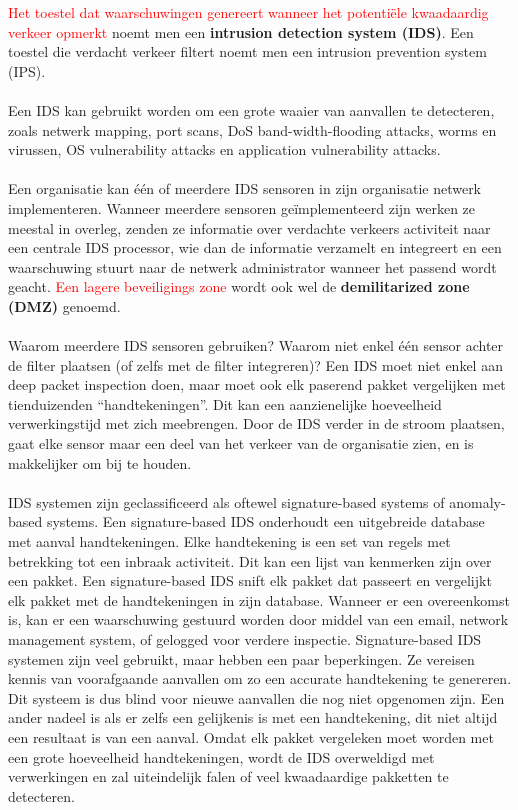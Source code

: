 \noindent\textcolor{red}{ Het toestel dat waarschuwingen genereert wanneer het potentiële kwaadaardig verkeer opmerkt} noemt men een \textbf{intrusion detection system (IDS)}. Een toestel die verdacht verkeer filtert noemt men een intrusion prevention system (IPS).
\\\\
Een IDS kan gebruikt worden om een grote waaier van aanvallen te detecteren, zoals netwerk mapping, port scans, DoS band-width-flooding attacks, worms en virussen, OS vulnerability attacks en application vulnerability attacks.
\\\\
Een organisatie kan één of meerdere IDS sensoren in zijn organisatie netwerk implementeren. Wanneer meerdere sensoren geïmplementeerd zijn werken ze meestal in overleg, zenden ze informatie over verdachte verkeers activiteit naar een centrale IDS processor, wie dan de informatie verzamelt en integreert en een waarschuwing stuurt naar de netwerk administrator wanneer het passend wordt geacht. \noindent\textcolor{red}{Een lagere beveiligings zone} wordt ook wel de \textbf{demilitarized zone (DMZ)} genoemd.
\\\\
Waarom meerdere IDS sensoren gebruiken? Waarom niet enkel één sensor achter de filter plaatsen (of zelfs met de filter integreren)? Een IDS moet niet enkel aan deep packet inspection doen, maar moet ook elk paserend pakket vergelijken met tienduizenden “handtekeningen”. Dit kan een aanzienelijke hoeveelheid verwerkingstijd met zich meebrengen. Door de IDS verder in de stroom plaatsen, gaat elke sensor maar een deel van het verkeer van de organisatie zien, en is makkelijker om bij te houden.
\\\\
IDS systemen zijn geclassificeerd als oftewel signature-based systems of anomaly-based systems. Een signature-based IDS onderhoudt een uitgebreide database met aanval handtekeningen. Elke handtekening is een set van regels met betrekking tot een inbraak activiteit. Dit kan een lijst van kenmerken zijn over een pakket. Een signature-based IDS snift elk pakket dat passeert en vergelijkt elk pakket met de handtekeningen in zijn database. Wanneer er een overeenkomst is, kan er een waarschuwing gestuurd worden door middel van een email, network management system, of gelogged voor verdere inspectie. Signature-based IDS systemen zijn veel gebruikt, maar hebben een paar beperkingen. Ze vereisen kennis van voorafgaande aanvallen om zo een accurate handtekening te genereren. Dit systeem is dus blind voor nieuwe aanvallen die nog niet opgenomen zijn. Een ander nadeel is als er zelfs een gelijkenis is met een handtekening, dit niet altijd een resultaat is van een aanval. Omdat elk pakket vergeleken moet worden met een grote hoeveelheid handtekeningen, wordt de IDS overweldigd met verwerkingen en zal uiteindelijk falen of veel kwaadaardige pakketten te detecteren.
